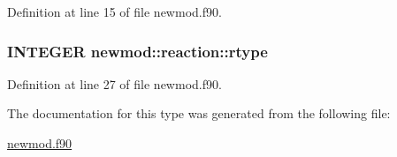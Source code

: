 Definition at line 15 of file newmod.f90.\hypertarget{typenewmod_1_1reaction_a3f7f53fd5c97562620036f7b3f9da767}{
\subsubsection[{rtype}]{\setlength{\rightskip}{0pt plus 5cm}INTEGER {\bf newmod::reaction::rtype}}}
\label{typenewmod_1_1reaction_a3f7f53fd5c97562620036f7b3f9da767}


Definition at line 27 of file newmod.f90.

The documentation for this type was generated from the following file:\begin{DoxyCompactItemize}
\item 
\hyperlink{newmod_8f90}{newmod.f90}\end{DoxyCompactItemize}

